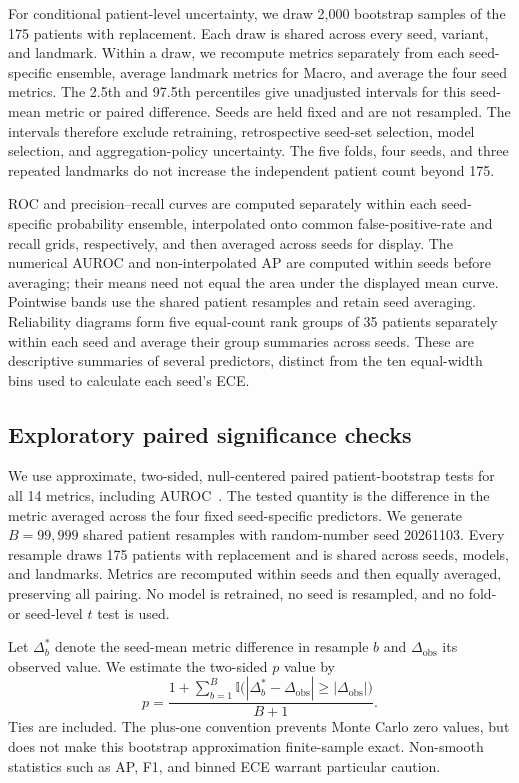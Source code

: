 For conditional patient-level uncertainty, we draw 2,000 bootstrap samples of the 175 patients with replacement. Each draw is shared across every seed, variant, and landmark. Within a draw, we recompute metrics separately from each seed-specific ensemble, average landmark metrics for Macro, and average the four seed metrics. The 2.5th and 97.5th percentiles give unadjusted intervals for this seed-mean metric or paired difference. Seeds are held fixed and are not resampled. The intervals therefore exclude retraining, retrospective seed-set selection, model selection, and aggregation-policy uncertainty. The five folds, four seeds, and three repeated landmarks do not increase the independent patient count beyond 175.

ROC and precision--recall curves are computed separately within each seed-specific probability ensemble, interpolated onto common false-positive-rate and recall grids, respectively, and then averaged across seeds for display. The numerical AUROC and non-interpolated AP are computed within seeds before averaging; their means need not equal the area under the displayed mean curve. Pointwise bands use the shared patient resamples and retain seed averaging. Reliability diagrams form five equal-count rank groups of 35 patients separately within each seed and average their group summaries across seeds. These are descriptive summaries of several predictors, distinct from the ten equal-width bins used to calculate each seed's ECE.

\subsection{Exploratory paired significance checks}
We use approximate, two-sided, null-centered paired patient-bootstrap tests for all 14 metrics, including AUROC~\citep{davison1997}. The tested quantity is the difference in the metric averaged across the four fixed seed-specific predictors. We generate $B=99{,}999$ shared patient resamples with random-number seed 20261103. Every resample draws 175 patients with replacement and is shared across seeds, models, and landmarks. Metrics are recomputed within seeds and then equally averaged, preserving all pairing. No model is retrained, no seed is resampled, and no fold- or seed-level $t$ test is used.

Let $\Delta_b^*$ denote the seed-mean metric difference in resample $b$ and $\Delta_{\mathrm{obs}}$ its observed value. We estimate the two-sided $p$ value by
\begin{equation}
 p=\frac{1+\sum_{b=1}^{B}\mathbb{I}\bigl(|\Delta_b^*-\Delta_{\mathrm{obs}}|\geq|\Delta_{\mathrm{obs}}|\bigr)}{B+1}.
\end{equation}
Ties are included. The plus-one convention prevents Monte Carlo zero values, but does not make this bootstrap approximation finite-sample exact. Non-smooth statistics such as AP, F1, and binned ECE warrant particular caution.

